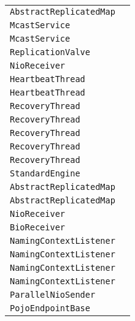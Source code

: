 \begin{center}
\begin{tabular}{ll}
\lstinline/AbstractReplicatedMap/&\raisebox{0pt}{\lstinline/ Vput()/}\\ 
\lstinline/McastService/&\raisebox{0pt}{\lstinline/ setDomain(byte[])/}\\ 
\lstinline/McastService/&\raisebox{0pt}{\lstinline/ setDomain(byte[])/}\\ 
\lstinline/ReplicationValve/&\raisebox{0pt}{\lstinline/ updateStats(long,long)/}\\ 
\lstinline/NioReceiver/&\raisebox{0pt}{\lstinline/ run()/}\\ 
\lstinline/HeartbeatThread/&\raisebox{0pt}{\lstinline/ run()/}\\ 
\lstinline/HeartbeatThread/&\raisebox{0pt}{\lstinline/ run()/}\\ 
\lstinline/RecoveryThread/&\raisebox{0pt}{\lstinline/ run()/}\\ 
\lstinline/RecoveryThread/&\raisebox{0pt}{\lstinline/ run()/}\\ 
\lstinline/RecoveryThread/&\raisebox{0pt}{\lstinline/ run()/}\\ 
\lstinline/RecoveryThread/&\raisebox{0pt}{\lstinline/ run()/}\\ 
\lstinline/RecoveryThread/&\raisebox{0pt}{\lstinline/ run()/}\\ 
\lstinline/StandardEngine/&\raisebox{0pt}{\lstinline/ logAccess(Request)/}\\ 
\lstinline/AbstractReplicatedMap/&\raisebox{0pt}{\lstinline/ Vput()/}\\ 
\lstinline/AbstractReplicatedMap/&\raisebox{0pt}{\lstinline/ Vput()/}\\ 
\lstinline/NioReceiver/&\raisebox{0pt}{\lstinline/ run()/}\\ 
\lstinline/BioReceiver/&\raisebox{0pt}{\lstinline/ listen())/}\\ 
\lstinline/NamingContextListener/&\raisebox{0pt}{\lstinline/ removeResourceLink(String)/}\\ 
\lstinline/NamingContextListener/&\raisebox{0pt}{\lstinline/ removeResourceLink(String)/}\\ 
\lstinline/NamingContextListener/&\raisebox{0pt}{\lstinline/ removeResourceLink(String)/}\\ 
\lstinline/NamingContextListener/&\raisebox{0pt}{\lstinline/ removeResourceLink(String)/}\\ 
\lstinline/ParallelNioSender/&\raisebox{0pt}{\lstinline/ booleankeepalive()/}\\ 
\lstinline/PojoEndpointBase/&\raisebox{0pt}{\lstinline/ onError(Session,Throwable)/}\\ 

\end{tabular}
\end{center}
